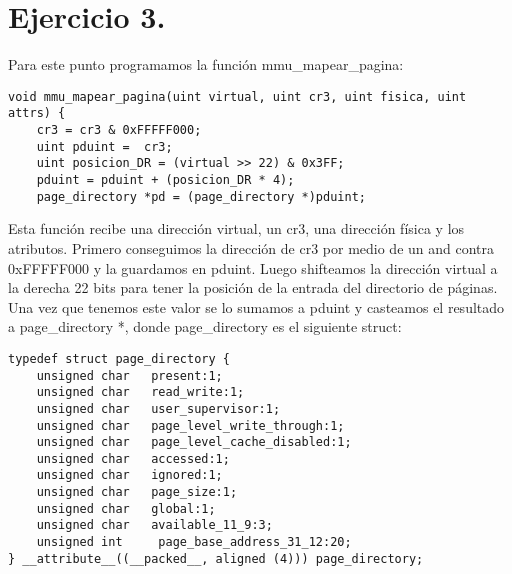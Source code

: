 \section*{Ejercicio 3.}

\noindent Para este punto programamos la función mmu\_mapear\_pagina:
\begin{codesnippet}
\begin{verbatim}
void mmu_mapear_pagina(uint virtual, uint cr3, uint fisica, uint attrs) {
    cr3 = cr3 & 0xFFFFF000;
    uint pduint =  cr3;
    uint posicion_DR = (virtual >> 22) & 0x3FF; 
    pduint = pduint + (posicion_DR * 4);
    page_directory *pd = (page_directory *)pduint;
\end{verbatim}
\end{codesnippet}

\noindent Esta función recibe una dirección virtual, un cr3, una dirección física y los atributos. Primero conseguimos la dirección de cr3 por medio de un and contra 0xFFFFF000 y la guardamos en pduint. Luego shifteamos la dirección virtual a la derecha 22 bits para tener la posición de la entrada del directorio de páginas. Una vez que tenemos este valor se lo sumamos a pduint y casteamos el resultado a page\_directory *, donde page\_directory es el siguiente struct:

\begin{codesnippet}
\begin{verbatim}
typedef struct page_directory {
    unsigned char   present:1;
    unsigned char   read_write:1;
    unsigned char   user_supervisor:1;
    unsigned char   page_level_write_through:1;
    unsigned char   page_level_cache_disabled:1;
    unsigned char   accessed:1;
    unsigned char   ignored:1;
    unsigned char   page_size:1;
    unsigned char   global:1;
    unsigned char   available_11_9:3;
    unsigned int     page_base_address_31_12:20;
} __attribute__((__packed__, aligned (4))) page_directory;
\end{verbatim}
\end{codesnippet}

